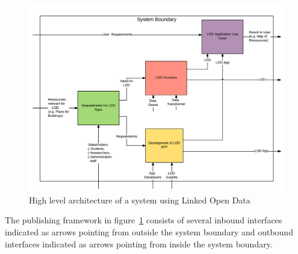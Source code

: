 \documentclass{article}
\begin{document}
\begin{figure}[H]
	\centering \includegraphics*[width=.8\columnwidth]{lod_architecture.png}
	\caption{High level architecture of a system using Linked Open Data}
	\label{fig:lod-architecture}
\end{figure}
The publishing framework in figure~\ref{fig:lod-architecture} consists of several inbound interfaces indicated as arrows pointing from outside the system boundary and outbound interfaces indicated as arrows pointing from inside the system boundary.
\end{document}
